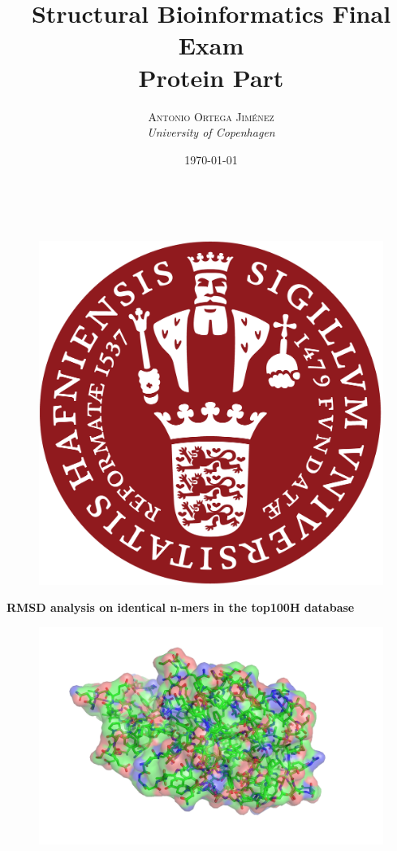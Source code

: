 \documentclass[a4paper, 11pt]{article} %
\title{\textbf{Structural Bioinformatics Final Exam}\\  %
\vspace{10pt}Protein Part} %
\author{\textsc{Antonio Ortega Jim\'enez} %
\\{\textit{University of Copenhagen}}} %
\date{\today} %
\makeatletter
\renewcommand{\maketitle}{ %
\begin{flushright} %
{\LARGE\@title} %

\vspace{50pt} %

{\large\@author} %
\\\@date %

\vspace{40pt} %
\end{flushright}
}
\makeatother
\begin{document}
\maketitle %
\thispagestyle{empty}

\vspace{-3.7cm}
\begin{figure}[!h]
\includegraphics[scale=0.35]{figures/ku_logo}
\end{figure}

\vspace{30pt}

\begin{center}
\Huge{\textbf{RMSD analysis on identical n-mers in the top100H database}}
\end{center}

\begin{figure}[!h]
\begin{center}
\includegraphics[scale=0.25]{../plots/cover}%
\end{center}
\end{figure}
\end{document}
